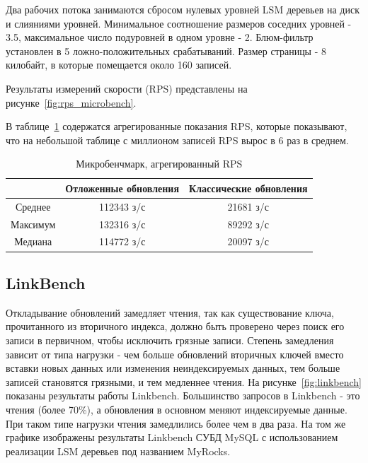 \documentclass[a4paper,hidelinks,12pt]{article}
\begin{document}
Два рабочих потока занимаются сбросом нулевых уровней LSM деревьев на диск и
слияниями уровней. Минимальное соотношение размеров соседних уровней - 3.5,
максимальное число подуровней в одном уровне - 2. Блюм-фильтр установлен в 5%
ложно-положительных срабатываний. Размер страницы - 8 килобайт, в которые
помещается около 160 записей.

Результаты измерений скорости (RPS) представлены на
рисунке~\ref{fig:rps_microbench}.

В таблице~\ref{table:rps_microbench} содержатся агрегированные показания RPS,
которые показывают, что на небольшой таблице с миллионом записей RPS вырос в 6
раз в среднем.

\begin{table}
\centering
\caption{Микробенчмарк, агрегированный RPS}
\label{table:rps_microbench}
\begin{tabular}{|c|c|c|} \hline
\cellcolor{table_header}&
\cellcolor{table_header}Отложенные обновления &
\cellcolor{table_header}Классические обновления\\ \hline

\cellcolor{table_header}Среднее &112343 з/с &21681 з/с\\ \hline
\cellcolor{table_header}Максимум &132316 з/с &89292 з/с\\ \hline
\cellcolor{table_header}Медиана &114772 з/с &20097 з/с\\
\hline\end{tabular}
\end{table}

\subsection{LinkBench}

Откладывание обновлений замедляет чтения, так как существование ключа,
прочитанного из вторичного индекса, должно быть проверено через поиск его записи
в первичном, чтобы исключить грязные записи. Степень замедления зависит от типа
нагрузки - чем больше обновлений вторичных ключей вместо вставки новых данных
или изменения неиндексируемых данных, тем больше записей становятся грязными,
и тем медленнее чтения. На рисунке~\ref{fig:linkbench} показаны результаты
работы Linkbench. Большинство запросов в Linkbench - это чтения (более 70\%), а
обновления в основном меняют индексируемые данные. При таком типе нагрузки
чтения замедлились более чем в два раза. На том же графике изображены результаты
Linkbench СУБД MySQL с использованием реализации LSM деревьев под названием
MyRocks.
\end{document}
